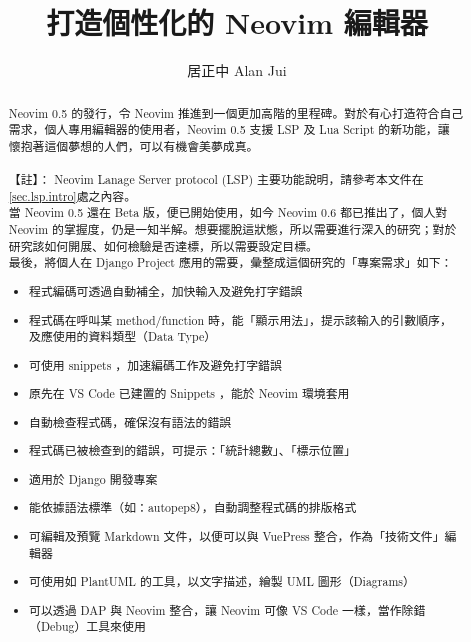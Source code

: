 \documentclass[]{article}
\title{打造個性化的 Neovim 編輯器 }
\author{居正中 Alan Jui}
\begin{document}
\maketitle
\thispagestyle{empty}
\clearpage

\setcounter{page}{1}

\begin{abstract}
Neovim 0.5 的發行，令 Neovim 推進到一個更加高階的里程碑。對於有心打造符合自己 需求，個人專用編輯器的使用者，Neovim 0.5 支援 LSP 及 Lua Script 的新功能，讓 懷抱著這個夢想的人們，可以有機會美夢成真。\\
\\
 【註】： Neovim Lanage Server protocol (LSP) 主要功能說明，請參考本文件在\ref{sec.lsp.intro}處之內容。\\

當 Neovim 0.5 還在 Beta 版，便已開始使用，如今 Neovim 0.6 都已推出了，個人對 Neovim 的掌握度，仍是一知半解。想要擺脫這狀態，所以需要進行深入的研究；對於 研究該如何開展、如何檢驗是否達標，所以需要設定目標。
\\

最後，將個人在 Django Project 應用的需要，彙整成這個研究的「專案需求」如下：
\begin{itemize}
  \item  程式編碼可透過自動補全，加快輸入及避免打字錯誤
  \item  程式碼在呼叫某 method/function 時，能「顯示用法」，提示該輸入的引數順序， 及應使用的資料類型（Data Type）
  \item  可使用 snippets ，加速編碼工作及避免打字錯誤
  \item  原先在 VS Code 已建置的 Snippets ，能於 Neovim 環境套用
  \item  自動檢查程式碼，確保沒有語法的錯誤
  \item  程式碼已被檢查到的錯誤，可提示：「統計總數」、「標示位置」
  \item  適用於 Django 開發專案
  \item  能依據語法標準（如：autopep8），自動調整程式碼的排版格式
  \item  可編輯及預覽 Markdown 文件，以便可以與 VuePress 整合，作為「技術文件」編輯器
  \item  可使用如 PlantUML 的工具，以文字描述，繪製 UML 圖形（Diagrams）
  \item  可以透過 DAP 與 Neovim 整合，讓 Neovim 可像 VS Code 一樣，當作除錯（Debug）工具來使用
\end{itemize} \\



\end{abstract}
\end{document}
